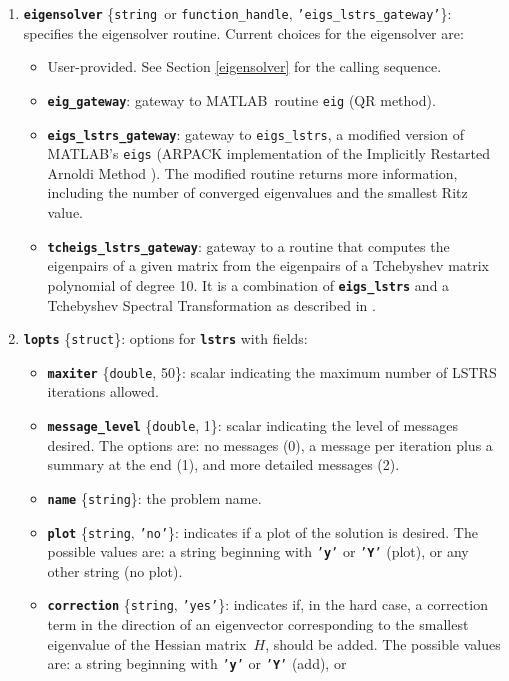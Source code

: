 \documentclass[acmtoms]{acmtrans2m}
\newcommand{\struct}{{\tt struct}}
\newcommand{\double}{{\tt double}}
\newcommand{\fh}{{\tt function\_handle}}
\newcommand{\mstring}{{\tt string}}
\newcommand{\matlab}{MATLAB}
\newcommand{\hessian}{H}
\begin{document}
\begin{enumerate}
\item{\tt\bf eigensolver} \{\mstring\ or \fh, {\tt 'eigs\_lstrs\_gateway'}\}: specifies
the eigensolver routine. Current choices for the eigensolver are:
\begin{itemize}
\item User-provided. See Section \ref{eigensolver} for the calling sequence.
\item {\tt\bf eig\_gateway}: gateway to \matlab\ routine {\tt eig}
(QR method).
\item {\tt\bf eigs\_lstrs\_gateway}: gateway to {\tt eigs\_lstrs}, a modified
version of \matlab's {\tt eigs} (ARPACK \cite{arpack} implementation of the Implicitly Restarted Arnoldi Method \cite{sorensen1992}).
The modified routine returns more information, 
including the number of converged eigenvalues and the smallest
Ritz value.
\item{\tt\bf tcheigs\_lstrs\_gateway}: gateway to a routine that computes
the eigenpairs of a given matrix from the eigenpairs of a Tchebyshev matrix polynomial
of degree 10. It is a combination of {\tt\bf eigs\_lstrs} and a
Tchebyshev Spectral Transformation as described in \cite{rs2002}. %
\end{itemize}
\item{\tt\bf lopts} \{\struct\}: options for {\tt\bf lstrs} with fields:
\begin{itemize}
\item {\tt\bf maxiter} \{\double, 50\}: scalar indicating the maximum number of LSTRS
iterations allowed.
\item {\tt\bf message\_level} \{\double, 1\}: scalar indicating the level of messages
desired. The options are: no messages (0), a message per iteration
plus a summary at the end (1), and more detailed messages (2).
\item {\tt\bf name} \{\mstring\}: the problem name.
\item {\tt\bf plot} \{\mstring, {\tt 'no'}\}: indicates if a plot of the solution
is desired. The possible values are:
a string beginning with {\tt'{\bf y}'} or {\tt'{\bf Y}'} (plot), or any other
string (no plot).
\item {\tt\bf correction} \{\mstring, {\tt 'yes'}\}: indicates if, in the
hard case, a correction term in the direction of an eigenvector corresponding to the
smallest eigenvalue of the Hessian matrix\ $\hessian$, should be added. 
The possible values are: a string beginning with {\tt'{\bf y}'} or {\tt'{\bf Y}'} (add), or

\end{itemize}
\end{enumerate}
\end{document}
